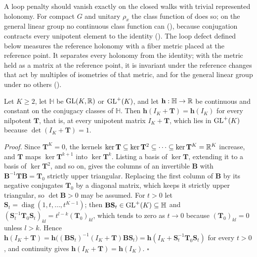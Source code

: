 A loop penalty should vanish exactly on the closed walks with trivial represented holonomy. For compact
$G$ and unitary $\rho_x$ the class function of  does so; on the general
linear group no continuous class function can (), because
conjugation contracts every unipotent element to the identity
(). The loop defect defined below measures the reference
holonomy with a fiber metric placed at the reference point. It separates every holonomy from the
identity; with the metric held as a matrix at the reference point, it is invariant under the reference
changes that act by multiples of isometries of that metric, and for the general linear group under no
others ().

Let $K\geq2$, let $\mathbb H$ be $\mathrm{GL}(K,\mathbb R)$ or $\mathrm{GL}^+(K)$, and let $\mathbf h:\mathbb H\to\mathbb R$ be
continuous and constant on the conjugacy classes of $\mathbb H$. Then $\mathbf h(I_K+\mathbf T)=\mathbf h(I_K)$
for every nilpotent $\mathbf T$, that is, at every unipotent matrix $I_K+\mathbf T$, which lies in
$\mathrm{GL}^+(K)$ because $\det(I_K+\mathbf T)=1$. 

\noindent\emph{Proof.}
Since $\mathbf T^K=0$, the kernels
$\ker\mathbf T\subseteq\ker\mathbf T^2\subseteq\cdots\subseteq\ker\mathbf T^K=\mathbb R^K$ increase, and
$\mathbf T$ maps $\ker\mathbf T^{k+1}$ into $\ker\mathbf T^k$. Listing a basis of $\ker\mathbf T$,
extending it to a basis of $\ker\mathbf T^2$, and so on, gives the columns of an invertible $\mathbf B$
with $\mathbf B^{-1}\mathbf T\mathbf B=\mathbf T_0$ strictly upper triangular. Replacing the first column
of $\mathbf B$ by its negative conjugates $\mathbf T_0$ by a diagonal matrix, which keeps it strictly
upper triangular, so $\det\mathbf B>0$ may be assumed. For $t>0$ let
$\mathbf S_t=\operatorname{diag}(1,t,\ldots,t^{K-1})$; then $\mathbf B\mathbf S_t\in\mathrm{GL}^+(K)\subseteq\mathbb H$
and $(\mathbf S_t^{-1}\mathbf T_0\mathbf S_t)_{kl}=t^{l-k}(\mathbf T_0)_{kl}$, which tends to zero as
$t\to0$ because $(\mathbf T_0)_{kl}=0$ unless $l>k$. Hence
$\mathbf h(I_K+\mathbf T)=\mathbf h\bigl((\mathbf B\mathbf S_t)^{-1}(I_K+\mathbf T)\mathbf B\mathbf S_t\bigr)
=\mathbf h(I_K+\mathbf S_t^{-1}\mathbf T_0\mathbf S_t)$ for every $t>0$, and continuity gives
$\mathbf h(I_K+\mathbf T)=\mathbf h(I_K)$. \hfill$\square$

